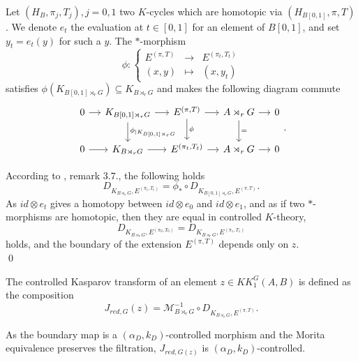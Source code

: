 \begin{dem}
Let $(H_B, \pi_j,T_j), j=0,1$ two $K$-cycles which are homotopic via $(H_{B[0,1]},\pi,T)$. We denote $e_t$ the evaluation at $t\in[0,1]$ for an element of $B[0,1]$, and set $y_t=e_t(y)$ for such a $y$. The $*$-morphism
\[\phi : \left\{\begin{array}{lll}E^{(\pi,T)} & \rightarrow & E^{(\pi_t,T_t)} \\ (x,y) & \mapsto & (x, y_t)\end{array}\right.\]
satisfies $\phi(K_{B[0,1] \rtimes_r G})\subseteq K_{B \rtimes_r G}$ and makes the following diagram commute
\[\begin{tikzcd}[column sep = small]
0\arrow{r} & K_{B[0,1] \rtimes_r G}\arrow{r}\arrow{d}{\phi_{|K_{B[0,1] \rtimes_r G}}} & E^{(\pi,T)} \arrow{r}\arrow{d}{\phi} & A\rtimes_r G \arrow{r}\arrow{d}{=}& 0 \\
0\arrow{r} & K_{B \rtimes_r G}\arrow{r} &  E^{(\pi_t,T_t)} \arrow{r} & A\rtimes_r G \arrow{r} & 0
\end{tikzcd}.\]

According to \cite{OY2}, remark $3.7.$, the following holds
\[D_{K_{B\rtimes_r G},E^{(\pi_t,T_t)}} = \phi_* \circ D_{K_{B[0,1]\rtimes_r G},E^{(\pi,T)}}.\]
As $id \otimes e_t$ gives a homotopy between $id\otimes e_0$ and $id\otimes e_1$, and as if two $*$-morphisms are homotopic, then they are equal in controlled $K$-theory, 
\[D_{K_{B\rtimes_r G}, E^{(\pi_0,T_0)}}=D_{K_{B\rtimes_r G}, E^{(\pi_1,T_1)}}\]
holds, and the boundary of the extension $E^{(\pi,T)}$ depends only on $z$.\\
\qed
\end{dem}

\begin{definition}
The controlled Kasparov transform of an element $z\in KK_1^G(A,B)$ is defined as the composition
\[J_{red,G}(z)=\mathcal M_{B\rtimes_r G}^{-1}\circ D_{K_{B\rtimes_r G}, E^{(\pi,T)}}.\]
\end{definition}

As the boundary map is a $(\alpha_D,k_D)$-controlled morphism and the Morita equivalence preserves the filtration, $J_{red,G(z)}$ is  $(\alpha_D,k_D)$-controlled. 

